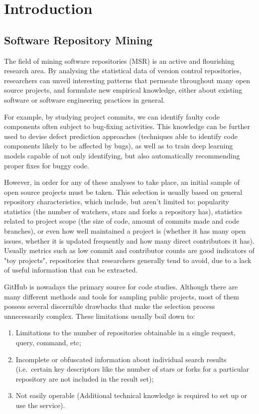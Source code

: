 \chapter{Introduction}

\section{Software Repository Mining}

The field of mining software repositories (MSR) is an active and flourishing research area.
By analysing the statistical data of version control repositories, researchers can unveil interesting patterns that permeate throughout many open source projects, and formulate new empirical knowledge, either about existing software or software engineering practices in general.

For example, by studying project commits, we can identify faulty code components often subject to bug-fixing activities.
This knowledge can be further used to devise defect prediction approaches (techniques able to identify code components likely to be affected by bugs), as well as to train deep learning models capable of not only identifying, but also automatically recommending proper fixes for buggy code.

However, in order for any of these analyses to take place, an initial sample of open source projects must be taken.
This selection is usually based on general repository characteristics, which include, but aren't limited to: popularity statistics (the number of watchers, stars and forks a repository has), statistics related to project scope (the size of code, amount of commits made and code branches), or even how well maintained a project is (whether it has many open issues, whether it is updated frequently and how many direct contributors it has).
Usually metrics such as low commit and contributor counts are good indicators of "toy projects", repositories that researchers generally tend to avoid, due to a lack of useful information that can be extracted.

GitHub is nowadays the primary source for code studies. Although there are many different methods and tools for sampling public projects, most of them possess several discernible drawbacks that make the selection process unnecessarily complex. These limitations usually boil down to:
\begin{enumerate}
    \item Limitations to the number of repositories obtainable in a single request, query, command, etc;
    \item Incomplete or obfuscated information about individual search results (i.e.\ certain key descriptors like the number of stars or forks for a particular repository are not included in the result set);
    \item Not easily operable (Additional technical knowledge is required to set up or use the service).
\end{enumerate}

